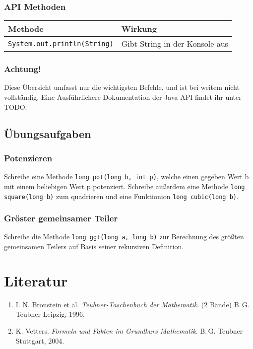 		\subsubsection{API Methoden}
		\begin{tabular}{ll}
		\textbf{Methode} & \textbf{Wirkung}\\
		\hline
		\lstinline$System.out.println(String)$ & Gibt String in der Konsole aus\\
		
		\end{tabular}

		\subsubsection{Achtung!}
			Diese Übersicht umfasst nur die wichtigsten Befehle, und ist bei weitem nicht vollständig. Eine Ausführlichere Dokumentation der Java API findet ihr unter TODO.

	\subsection{Übungsaufgaben}
		\subsubsection{Potenzieren}
			Schreibe eine Methode \lstinline$long pot(long b, int p)$, welche einen gegeben Wert b mit einem beliebigen Wert p potenziert. Schreibe außerdem eine Methode \lstinline$long square(long b)$ zum quadrieren und eine Funktionion \lstinline$long cubic(long b)$.
		\subsubsection{Gröster gemeinsamer Teiler}
			Schreibe die Methode \lstinline$long ggt(long a, long b)$ zur Berechnung des größten gemeinsamen Teilers auf Basis seiner rekursiven Definition.


\section{Literatur}

\renewcommand{\labelenumi}{[\arabic{enumi}]}
\renewcommand{\theenumi}{[\arabic{enumi}]}
\begin{enumerate}
\item
I. N. Bronstein et al. \textit{Teubner-Taschenbuch der Mathematik}. (2 Bände)
B.\,G. Teubner Leipzig, 1996.

\item
K. Vetters. \textit{Formeln und Fakten im Grundkurs Mathematik}. B.\,G. Teubner Stuttgart, 2004.

\end{enumerate}
\pagestyle{scrplain}
\ofoot[]{}

\cleardoublepage
%
